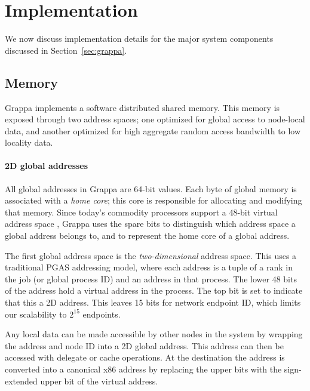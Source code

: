\section{Implementation} \label{sec:implementation}

We now discuss implementation details for the major system components discussed in Section~\ref{sec:grappa}.

\subsection{Memory}

Grappa implements a software distributed shared memory. This memory is
exposed through two address spaces; one optimized for global access to
node-local data, and another optimized for high aggregate random
access bandwidth to low locality data.

\paragraph{2D global addresses} All global addresses in Grappa are 64-bit values. Each byte of global
memory is associated with a {\em home core}; this core is responsible
for allocating and modifying that memory. Since today's commodity
processors support a 48-bit virtual address space , Grappa
uses the spare bits to distinguish which address space a global
address belongs to, and to represent the home core of a global
address.

The first global address space is the {\em two-dimensional} address
space. This uses a traditional PGAS addressing model, where each
address is a tuple of a rank in the job (or global process ID) and an
address in that process. The lower 48 bits of the address hold a
virtual address in the process. The top bit is set to indicate that
this a 2D address. This leaves 15 bits for network endpoint ID, which
limits our scalability to $2^15$ endpoints.

Any local data can be made accessible by other nodes in the system by
wrapping the address and node ID into a 2D global address. This
address can then be accessed with delegate or cache operations. At the
destination the address is converted into a canonical x86 address by
replacing the upper bits with the sign-extended upper bit of the
virtual address.

